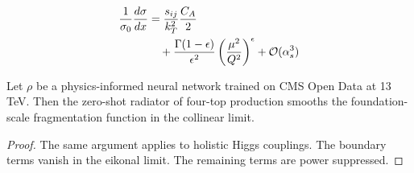\begin{align}
  \frac{1}{\sigma_0} \frac{d\sigma}{dx} &= \frac{s_{ij}}{k_T^2} \frac{C_A}{2} \nonumber \\
  &\quad + \frac{\Gamma(1-\epsilon)}{\epsilon^{2}} \left(\frac{\mu^2}{Q^2}\right)^{\epsilon} + \mathcal{O}(\alpha_s^3) \label{eq:3}
\end{align}

\begin{proposition}\label{thm:1}
Let $\rho$ be a physics-informed neural network trained on CMS Open Data
at 13 TeV. Then the zero-shot radiator of four-top production smooths
the foundation-scale fragmentation function in the collinear limit.
\end{proposition}

\begin{proof}
The same argument applies to holistic Higgs couplings. The boundary
terms vanish in the eikonal limit. The remaining terms are power
suppressed.
\end{proof}

